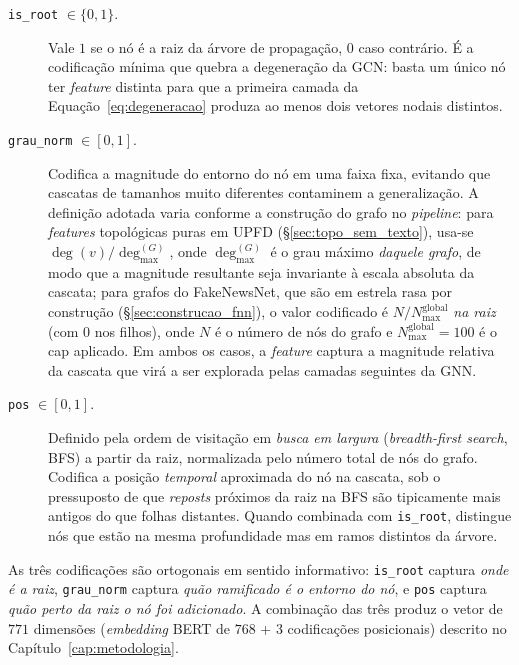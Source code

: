 \begin{description}
\item[\texttt{is\_root} $\in \{0, 1\}$.] Vale $1$ se o n\'o \'e a raiz
  da \'arvore de propaga\c{c}\~ao, $0$ caso contr\'ario. \'E a
  codifica\c{c}\~ao m\'inima que quebra a degenera\c{c}\~ao da GCN:
  basta um \'unico n\'o ter \emph{feature} distinta para que a primeira
  camada da Equa\c{c}\~ao~\ref{eq:degeneracao} produza ao menos dois
  vetores nodais distintos.

\item[{\texttt{grau\_norm} $\in [0, 1]$.}] Codifica a magnitude do
  entorno do n\'o em uma faixa fixa, evitando que cascatas de tamanhos
  muito diferentes contaminem a generaliza\c{c}\~ao. A
  defini\c{c}\~ao adotada varia conforme a constru\c{c}\~ao do grafo
  no \emph{pipeline}: para \emph{features} topol\'ogicas puras em UPFD
  (\S\ref{sec:topo_sem_texto}), usa-se $\deg(v) / \deg_{\max}^{(G)}$,
  onde $\deg_{\max}^{(G)}$ \'e o grau m\'aximo \emph{daquele grafo}, de
  modo que a magnitude resultante seja invariante \`a escala absoluta
  da cascata; para grafos do FakeNewsNet, que s\~ao em estrela rasa por
  constru\c{c}\~ao (\S\ref{sec:construcao_fnn}), o valor codificado \'e
  $N/N_{\max}^{\mathrm{global}}$ \emph{na raiz} (com 0 nos filhos), onde
  $N$ \'e o n\'umero de n\'os do grafo e $N_{\max}^{\mathrm{global}} =
  100$ \'e o cap aplicado. Em ambos os casos, a \emph{feature} captura
  a magnitude relativa da cascata que vir\'a a ser explorada pelas
  camadas seguintes da GNN.

\item[{\texttt{pos} $\in [0, 1]$.}] Definido pela ordem de visita\c{c}\~ao
  em \emph{busca em largura} (\emph{breadth-first search}, BFS) a
  partir da raiz, normalizada pelo n\'umero total de n\'os do grafo.
  Codifica a posi\c{c}\~ao \emph{temporal} aproximada do n\'o na
  cascata, sob o pressuposto de que \emph{reposts} pr\'oximos da raiz
  na BFS s\~ao tipicamente mais antigos do que folhas distantes.
  Quando combinada com \texttt{is\_root}, distingue n\'os que est\~ao
  na mesma profundidade mas em ramos distintos da \'arvore.
\end{description}

As tr\^es codifica\c{c}\~oes s\~ao ortogonais em sentido informativo:
\texttt{is\_root} captura \emph{onde \'e a raiz}, \texttt{grau\_norm}
captura \emph{qu\~ao ramificado \'e o entorno do n\'o}, e \texttt{pos}
captura \emph{qu\~ao perto da raiz o n\'o foi adicionado}. A
combina\c{c}\~ao das tr\^es produz o vetor de $771$ dimens\~oes
(\emph{embedding} BERT de $768$ + 3 codifica\c{c}\~oes posicionais)
descrito no Cap\'itulo~\ref{cap:metodologia}.


